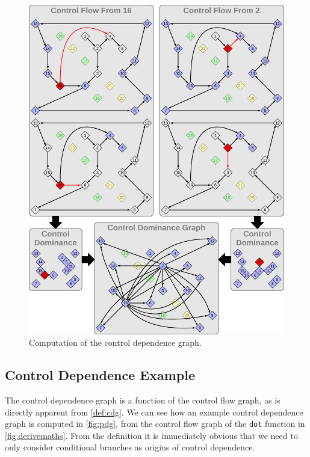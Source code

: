 \begin{figure}[p]
    \centering
    \includegraphics[width=\textwidth,height=1.5\textwidth]{figures/schaubild2.pdf}

    \vspace{27.38136pt}
    \caption{Computation of the control dependence graph.}
    \label{fig:pdg}
\end{figure}


\subsection{Control Dependence Example}

    The control dependence graph is a function of the control flow graph, as is
    directly apparent from \autoref{def:cdg}.
    We can see how an example control dependence graph is computed in
    \autoref{fig:pdg}, from the control flow graph of the \texttt{dot} function
    in \autoref{fig:derivemaths}.
    From the definition it is immediately obvious that we need to only consider
    conditional branches as origins of control dependence.

